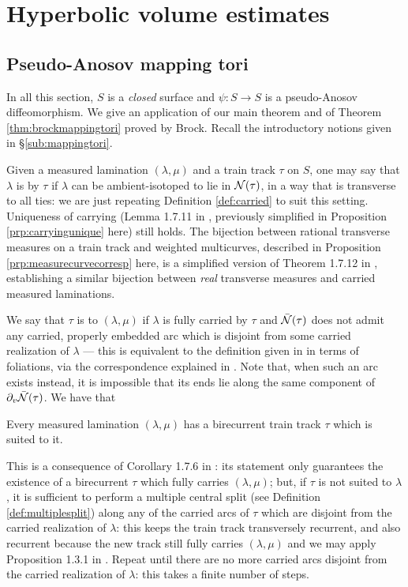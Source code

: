 \chapter{Hyperbolic volume estimates}

\section{Pseudo-Anosov mapping tori}

In all this section, $S$ is a \emph{closed} surface and $\psi:S\rightarrow S$ is a pseudo-Anosov diffeomorphism. We give an application of our main theorem and of Theorem \ref{thm:brockmappingtori} proved by Brock. Recall the introductory notions given in \S \ref{sub:mappingtori}.

Given a measured lamination $(\lambda,\mu)$ and a train track $\tau$ on $S$, one may say that $\lambda$ is  by $\tau$ if $\lambda$ can be ambient-isotoped to lie in ${\mathcal N}(\tau)$, in a way that is transverse to all ties: we are just repeating Definition \ref{def:carried} to suit this setting. Uniqueness of carrying (Lemma 1.7.11 in \cite{penner}, previously simplified in Proposition \ref{prp:carryingunique} here) still holds. The bijection between rational transverse measures on a train track and weighted multicurves, described in Proposition \ref{prp:measurecurvecorresp} here, is a simplified version of Theorem 1.7.12 in \cite{penner}, establishing a similar bijection between \emph{real} transverse measures and carried measured laminations.

We say that $\tau$ is  to $(\lambda,\mu)$ if $\lambda$ is fully carried by $\tau$ and $\bar{{\mathcal N}}(\tau)$ does not admit any carried, properly embedded arc which is disjoint from some carried realization of $\lambda$ --- this is equivalent to the definition given in \cite{papadopoulos} in terms of foliations, via the correspondence explained in \cite{levitt}. Note that, when such an arc exists instead, it is impossible that its ends lie along the same component of $\partial_v\bar{{\mathcal N}}(\tau)$. We have that
\begin{claim}
Every measured lamination $(\lambda,\mu)$ has a birecurrent train track $\tau$ which is suited to it.
\end{claim}
This is a consequence of Corollary 1.7.6 in \cite{penner}: its statement only guarantees the existence of a birecurrent $\tau$ which fully carries $(\lambda,\mu)$; but, if $\tau$ is not suited to $\lambda$, it is sufficient to perform a multiple central split (see Definition \ref{def:multiplesplit}) along any of the carried arcs of $\tau$ which are disjoint from the carried realization of $\lambda$: this keeps the train track transversely recurrent, and also recurrent because the new track still fully carries $(\lambda,\mu)$ and we may apply Proposition 1.3.1 in \cite{penner}. Repeat until there are no more carried arcs disjoint from the carried realization of $\lambda$: this takes a finite number of steps.

